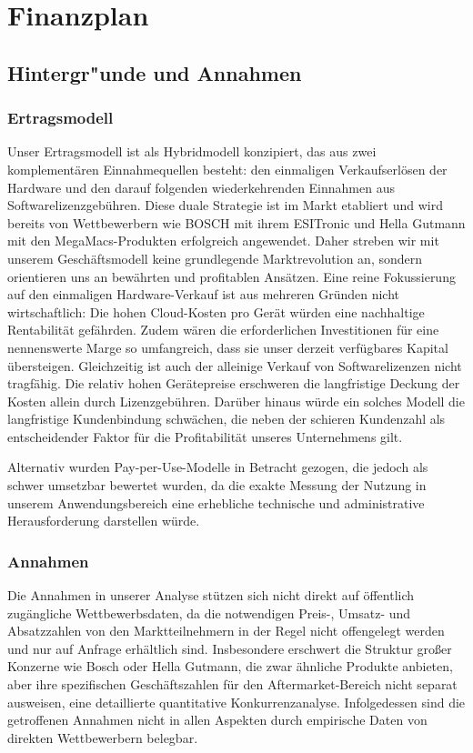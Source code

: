 \newpage

\section{Finanzplan}
\subsection{Hintergr"unde und Annahmen}
\subsubsection{Ertragsmodell}
Unser Ertragsmodell ist als Hybridmodell konzipiert, das aus zwei komplementären Einnahmequellen besteht: den einmaligen Verkaufserlösen der Hardware und den darauf folgenden wiederkehrenden Einnahmen aus Softwarelizenzgebühren. Diese duale Strategie ist im Markt etabliert und wird bereits von Wettbewerbern wie BOSCH mit ihrem ESITronic und Hella Gutmann mit den MegaMacs-Produkten erfolgreich angewendet. Daher streben wir mit unserem Geschäftsmodell keine grundlegende Marktrevolution an, sondern orientieren uns an bewährten und profitablen Ansätzen.
Eine reine Fokussierung auf den einmaligen Hardware-Verkauf ist aus mehreren Gründen nicht wirtschaftlich: Die hohen Cloud-Kosten pro Gerät würden eine nachhaltige Rentabilität gefährden. Zudem wären die erforderlichen Investitionen für eine nennenswerte Marge so umfangreich, dass sie unser derzeit verfügbares Kapital übersteigen. Gleichzeitig ist auch der alleinige Verkauf von Softwarelizenzen nicht tragfähig. Die relativ hohen Gerätepreise erschweren die langfristige Deckung der Kosten allein durch Lizenzgebühren. Darüber hinaus würde ein solches Modell die langfristige Kundenbindung schwächen, die neben der schieren Kundenzahl als entscheidender Faktor für die Profitabilität unseres Unternehmens gilt.

Alternativ wurden Pay-per-Use-Modelle in Betracht gezogen, die jedoch als schwer umsetzbar bewertet wurden, da die exakte Messung der Nutzung in unserem Anwendungsbereich eine erhebliche technische und administrative Herausforderung darstellen würde.

\subsubsection{Annahmen}
Die Annahmen in unserer Analyse stützen sich nicht direkt auf öffentlich zugängliche Wettbewerbsdaten, da die notwendigen Preis-, Umsatz- und Absatzzahlen von den Marktteilnehmern in der Regel nicht offengelegt werden und nur auf Anfrage erhältlich sind. Insbesondere erschwert die Struktur großer Konzerne wie Bosch oder Hella Gutmann, die zwar ähnliche Produkte anbieten, aber ihre spezifischen Geschäftszahlen für den Aftermarket-Bereich nicht separat ausweisen, eine detaillierte quantitative Konkurrenzanalyse. Infolgedessen sind die getroffenen Annahmen nicht in allen Aspekten durch empirische Daten von direkten Wettbewerbern belegbar.


